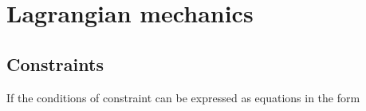 \documentclass[a4paper,12pt]{report}
\begin{document}
\chapter{Lagrangian mechanics}
\section{Constraints}
If the conditions of constraint can be expressed as equations in the form 
\end{document}
